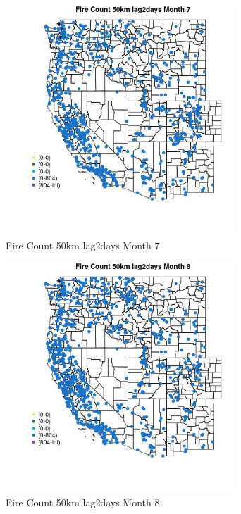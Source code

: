 \begin{figure} 
\centering  
\includegraphics[width=0.77\textwidth]{Code_Outputs/Report_ML_input_PM25_Step4_part_f_de_duplicated_aveswNAs_MapObsMo7Fire_Count_50km_lag2days.jpg} 
\caption{\label{fig:Report_ML_input_PM25_Step4_part_f_de_duplicated_aveswNAsMapObsMo7Fire_Count_50km_lag2days}Fire Count 50km lag2days Month 7} 
\end{figure} 
 

\begin{figure} 
\centering  
\includegraphics[width=0.77\textwidth]{Code_Outputs/Report_ML_input_PM25_Step4_part_f_de_duplicated_aveswNAs_MapObsMo8Fire_Count_50km_lag2days.jpg} 
\caption{\label{fig:Report_ML_input_PM25_Step4_part_f_de_duplicated_aveswNAsMapObsMo8Fire_Count_50km_lag2days}Fire Count 50km lag2days Month 8} 
\end{figure} 
 

